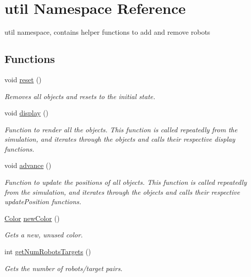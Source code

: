 \hypertarget{namespaceutil}{\section{util Namespace Reference}
\label{namespaceutil}
}


util namespace, contains helper functions to add and remove robots  


\subsection*{Functions}
\begin{DoxyCompactItemize}
\item 
void \hyperlink{namespaceutil_aba9dfe2df4467075a8bcbaccbbe65d55}{reset} ()
\begin{DoxyCompactList}\small\item\em Removes all objects and resets to the initial state. \end{DoxyCompactList}\item 
void \hyperlink{namespaceutil_a07ce92ef6b2053de6e300d9ae17fd9d6}{display} ()
\begin{DoxyCompactList}\small\item\em Function to render all the objects.  This function is called repeatedly from the simulation, and iterates through the objects and calls their respective display functions. \end{DoxyCompactList}\item 
void \hyperlink{namespaceutil_ab0e8cf018dc107d06862a57d79e80538}{advance} ()
\begin{DoxyCompactList}\small\item\em Function to update the positions of all objects.  This function is called repeatedly from the simulation, and iterates through the objects and calls their respective update\-Position functions. \end{DoxyCompactList}\item 
\hyperlink{structColor}{Color} \hyperlink{namespaceutil_a0f3ef8558c61f7969d479448b9c96c78}{new\-Color} ()
\begin{DoxyCompactList}\small\item\em Gets a new, unused color. \end{DoxyCompactList}\item 
int \hyperlink{namespaceutil_a16b3e2bc651bf6876b111d58ccddad3c}{get\-Num\-Robots\-Targets} ()
\begin{DoxyCompactList}\small\item\em Gets the number of robots/target pairs. \end{DoxyCompactList}\item 

\end{DoxyCompactItemize}

